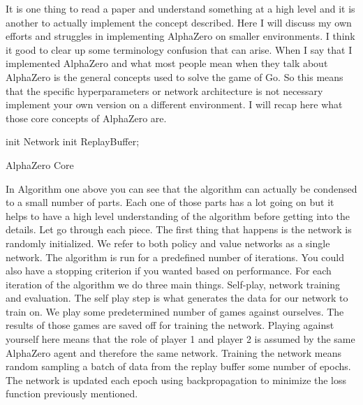 
It is one thing to read a paper and understand something at a high level and it is another to actually implement the concept described. Here I will discuss my own efforts and struggles in implementing AlphaZero on smaller environments. I think it good to clear up some terminology confusion that can arise. When I say that I implemented AlphaZero and what most people mean when they talk about AlphaZero is the general concepts used to solve the game of Go. So this means that the specific hyperparameters or network architecture is not necessary implement your own version on a different environment. I will recap here what those core concepts of AlphaZero are. 

\begin{algorithm}[H]
\SetAlgoLined
 init Network\;
 init ReplayBuffer;
 
 \caption{AlphaZero Core}
  
\end{algorithm}

In Algorithm one above you can see that the algorithm can actually be condensed to a small number of parts. Each one of those parts has a lot going on but it helps to have a high level understanding of the algorithm before getting into the details. Let go through each piece. The first thing that happens is the network is randomly initialized. We refer to both policy and value networks as a single network. The algorithm is run for a predefined number of iterations. You could also have a stopping criterion if you wanted based on performance. For each iteration of the algorithm we do three main things. Self-play, network training and evaluation. The self play step is what generates the data for our network to train on. We play some predetermined number of games against ourselves. The results of those games are saved off for training the network. Playing against yourself here means that the role of player 1 and player 2 is assumed by the same AlphaZero agent and therefore the same network. Training the network means random sampling a batch of data from the replay buffer some number of epochs. The network is updated each epoch using backpropagation to minimize the loss function previously mentioned.  

